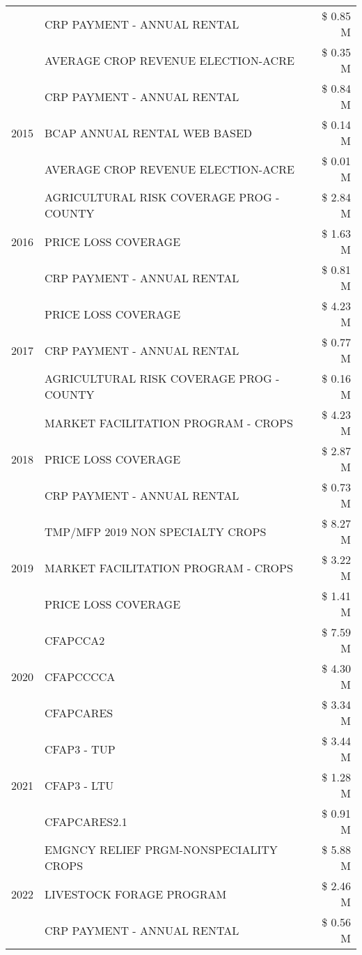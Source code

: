 \begin{tabular}{llr}
 & CRP PAYMENT - ANNUAL RENTAL & \$ 0.85 M \\
 & AVERAGE CROP REVENUE ELECTION-ACRE & \$ 0.35 M \\
\cline{1-3}
\multirow[t]{3}{*}{2015} & CRP PAYMENT - ANNUAL RENTAL & \$ 0.84 M \\
 & BCAP ANNUAL RENTAL WEB BASED & \$ 0.14 M \\
 & AVERAGE CROP REVENUE ELECTION-ACRE & \$ 0.01 M \\
\cline{1-3}
\multirow[t]{3}{*}{2016} & AGRICULTURAL RISK COVERAGE PROG - COUNTY & \$ 2.84 M \\
 & PRICE LOSS COVERAGE & \$ 1.63 M \\
 & CRP PAYMENT - ANNUAL RENTAL & \$ 0.81 M \\
\cline{1-3}
\multirow[t]{3}{*}{2017} & PRICE LOSS COVERAGE & \$ 4.23 M \\
 & CRP PAYMENT - ANNUAL RENTAL & \$ 0.77 M \\
 & AGRICULTURAL RISK COVERAGE PROG - COUNTY & \$ 0.16 M \\
\cline{1-3}
\multirow[t]{3}{*}{2018} & MARKET FACILITATION PROGRAM - CROPS & \$ 4.23 M \\
 & PRICE LOSS COVERAGE & \$ 2.87 M \\
 & CRP PAYMENT - ANNUAL RENTAL & \$ 0.73 M \\
\cline{1-3}
\multirow[t]{3}{*}{2019} & TMP/MFP 2019 NON SPECIALTY CROPS & \$ 8.27 M \\
 & MARKET FACILITATION PROGRAM - CROPS & \$ 3.22 M \\
 & PRICE LOSS COVERAGE & \$ 1.41 M \\
\cline{1-3}
\multirow[t]{3}{*}{2020} & CFAPCCA2 & \$ 7.59 M \\
 & CFAPCCCCA & \$ 4.30 M \\
 & CFAPCARES & \$ 3.34 M \\
\cline{1-3}
\multirow[t]{3}{*}{2021} & CFAP3 - TUP & \$ 3.44 M \\
 & CFAP3 - LTU & \$ 1.28 M \\
 & CFAPCARES2.1 & \$ 0.91 M \\
\cline{1-3}
\multirow[t]{3}{*}{2022} & EMGNCY RELIEF PRGM-NONSPECIALITY CROPS & \$ 5.88 M \\
 & LIVESTOCK FORAGE PROGRAM & \$ 2.46 M \\
 & CRP PAYMENT - ANNUAL RENTAL & \$ 0.56 M \\
\cline{1-3}
\bottomrule
\end{tabular}
